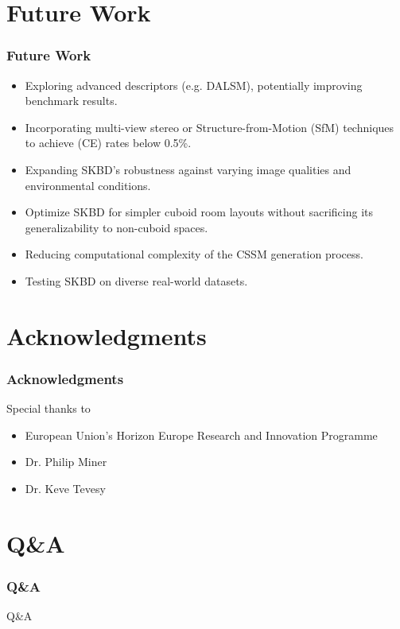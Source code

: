 \documentclass{beamer}
\begin{document}
\section{Future Work}
\begin{frame}
\frametitle{Future Work}
\begin{itemize}
    \item Exploring advanced descriptors (e.g. DALSM), potentially improving benchmark results.
    \item Incorporating multi-view stereo or Structure-from-Motion (SfM) techniques to achieve (CE) rates below 0.5\%.
    \item Expanding SKBD’s robustness against varying image qualities and environmental conditions. 
    \item Optimize SKBD for simpler cuboid room layouts without sacrificing its generalizability to non-cuboid spaces.
    \item Reducing computational complexity of the CSSM generation process.
    \item Testing SKBD on diverse real-world datasets.
\end{itemize}
\end{frame}

\section{Acknowledgments}
\begin{frame}
\frametitle{Acknowledgments}
Special thanks to
\begin{itemize}
    \item European Union's Horizon Europe Research and Innovation Programme
    \item Dr. Philip Miner
    \item Dr. Keve Tevesy
\end{itemize}
\end{frame}

\section{Q\&A}
\begin{frame}
\frametitle{Q\&A}
Q\&A
\end{frame}
\end{document}
